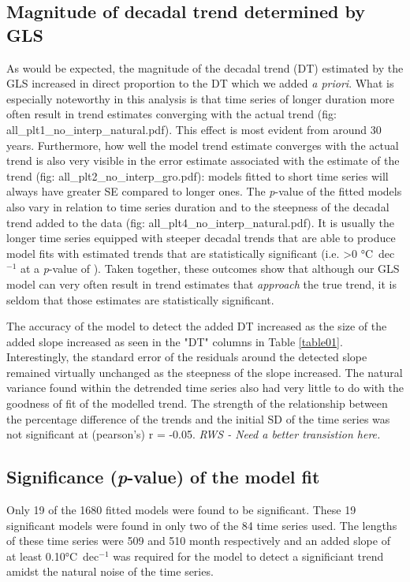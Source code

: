 \documentclass{ametsoc}
\begin{document}
\subsection{Magnitude of decadal trend determined by GLS}
As would be expected, the magnitude of the decadal trend (DT) estimated by the GLS increased in direct proportion to the DT which we added \emph{a priori}. What is especially noteworthy in this analysis is that time series of longer duration more often result in trend estimates converging with the actual trend (fig: all_plt1_no_interp_natural.pdf). This effect is most evident from around 30 years. Furthermore, how well the model trend estimate converges with the actual trend is also very visible in the error estimate associated with the estimate of the trend (fig: all_plt2_no_interp_gro.pdf): models fitted to short time series will always have greater SE compared to longer ones. The \emph{p}-value of the fitted models also vary in relation to time series duration and to the steepness of the decadal trend added to the data (fig: all_plt4_no_interp_natural.pdf). It is usually the longer time series equipped with steeper decadal trends that are able to produce model fits with estimated trends that are statistically significant (i.e. >0 \si{\degreeCelsius}~dec$^{-1}$ at a \emph{p}-value of ). Taken together, these outcomes show that although our GLS model can very often result in trend estimates that \emph{approach} the true trend, it is seldom that those estimates are statistically significant.

The accuracy of the model to detect the added DT increased as the size of the added slope increased as seen in the "DT" columns in Table \ref{table01}. Interestingly, the standard error of the residuals around the detected slope remained virtually unchanged as the steepness of the slope increased. The natural variance found within the detrended time series also had very little to do with the goodness of fit of the modelled trend. The strength of the relationship between the percentage difference of the trends and the initial SD of the time series was not significant at (pearson's) r = -0.05.
\emph{RWS - Need a better transistion here.}

\subsection{Significance (\emph{p}-value) of the model fit}
Only 19 of the 1680 fitted models were found to be significant. These 19 significant models were found in only two of the 84 time series used. The lengths of these time series were 509 and 510 month respectively and an added slope of at least 0.10\si{\degreeCelsius}~dec$^{-1}$ was required for the model to detect a significiant trend amidst the natural noise of the time series.
\end{document}
